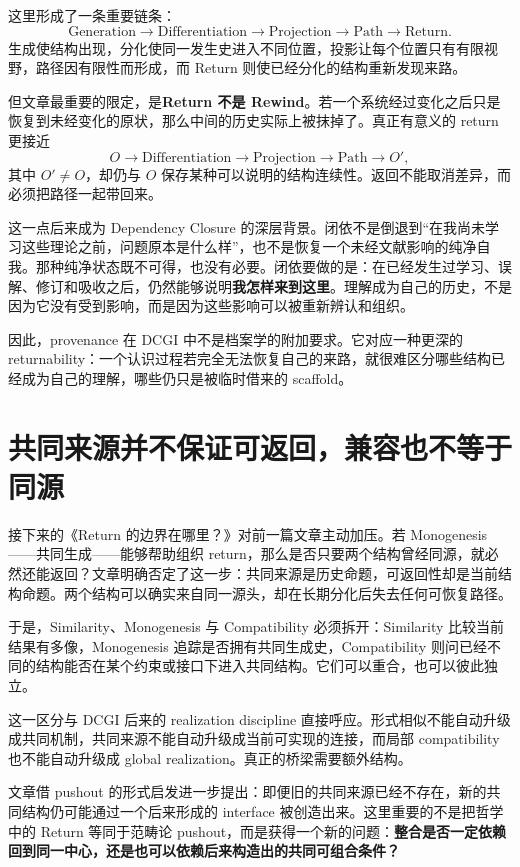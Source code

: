 \documentclass[UTF8,zihao=-4,fontset=none,oneside,openany]{ctexbook}
\begin{document}
这里形成了一条重要链条：
\[
\text{Generation}
\longrightarrow
\text{Differentiation}
\longrightarrow
\text{Projection}
\longrightarrow
\text{Path}
\longrightarrow
\text{Return}.
\]
生成使结构出现，分化使同一发生史进入不同位置，投影让每个位置只有有限视野，路径因有限性而形成，而 Return 则使已经分化的结构重新发现来路。

但文章最重要的限定，是\textbf{Return 不是 Rewind}。若一个系统经过变化之后只是恢复到未经变化的原状，那么中间的历史实际上被抹掉了。真正有意义的 return 更接近
\[
O\longrightarrow \text{Differentiation}
\longrightarrow \text{Projection}
\longrightarrow \text{Path}
\longrightarrow O',
\]
其中 $O'\neq O$，却仍与 $O$ 保存某种可以说明的结构连续性。返回不能取消差异，而必须把路径一起带回来。

这一点后来成为 Dependency Closure 的深层背景。闭依不是倒退到“在我尚未学习这些理论之前，问题原本是什么样”，也不是恢复一个未经文献影响的纯净自我。那种纯净状态既不可得，也没有必要。闭依要做的是：在已经发生过学习、误解、修订和吸收之后，仍然能够说明\textbf{我怎样来到这里}。理解成为自己的历史，不是因为它没有受到影响，而是因为这些影响可以被重新辨认和组织。

因此，provenance 在 DCGI 中不是档案学的附加要求。它对应一种更深的 returnability：一个认识过程若完全无法恢复自己的来路，就很难区分哪些结构已经成为自己的理解，哪些仍只是被临时借来的 scaffold。

\section{共同来源并不保证可返回，兼容也不等于同源}

接下来的《Return 的边界在哪里？》对前一篇文章主动加压。若 Monogenesis——共同生成——能够帮助组织 return，那么是否只要两个结构曾经同源，就必然还能返回？文章明确否定了这一步：共同来源是历史命题，可返回性却是当前结构命题。两个结构可以确实来自同一源头，却在长期分化后失去任何可恢复路径。\citep{peng-return-boundary}

于是，Similarity、Monogenesis 与 Compatibility 必须拆开：Similarity 比较当前结果有多像，Monogenesis 追踪是否拥有共同生成史，Compatibility 则问已经不同的结构能否在某个约束或接口下进入共同结构。它们可以重合，也可以彼此独立。

这一区分与 DCGI 后来的 realization discipline 直接呼应。形式相似不能自动升级成共同机制，共同来源不能自动升级成当前可实现的连接，而局部 compatibility 也不能自动升级成 global realization。真正的桥梁需要额外结构。

文章借 pushout 的形式启发进一步提出：即便旧的共同来源已经不存在，新的共同结构仍可能通过一个后来形成的 interface 被创造出来。这里重要的不是把哲学中的 Return 等同于范畴论 pushout，而是获得一个新的问题：\textbf{整合是否一定依赖回到同一中心，还是也可以依赖后来构造出的共同可组合条件？}
\end{document}
